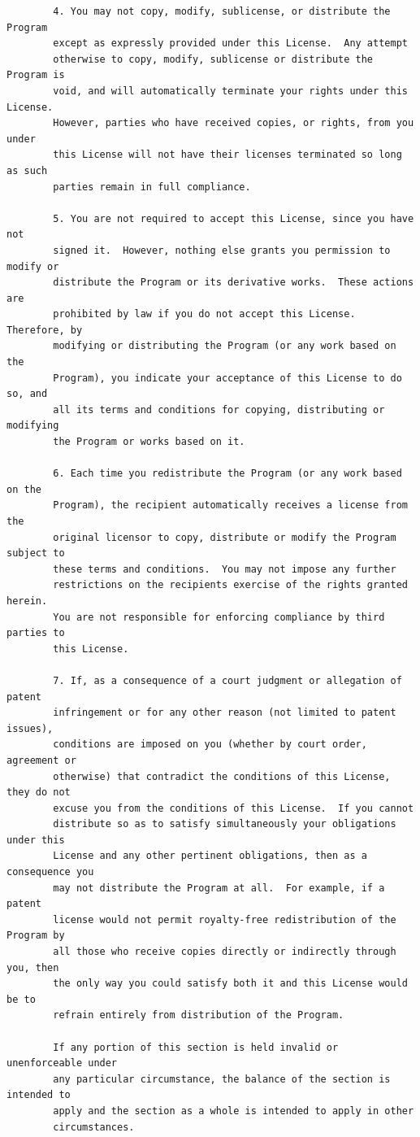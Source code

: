 \documentclass[a4paper,twoside,12pt]{book}
\begin{document}
{\begin{verbatim}
		4. You may not copy, modify, sublicense, or distribute the Program
		except as expressly provided under this License.  Any attempt
		otherwise to copy, modify, sublicense or distribute the Program is
		void, and will automatically terminate your rights under this License.
		However, parties who have received copies, or rights, from you under
		this License will not have their licenses terminated so long as such
		parties remain in full compliance.

		5. You are not required to accept this License, since you have not
		signed it.  However, nothing else grants you permission to modify or
		distribute the Program or its derivative works.  These actions are
		prohibited by law if you do not accept this License.  Therefore, by
		modifying or distributing the Program (or any work based on the
		Program), you indicate your acceptance of this License to do so, and
		all its terms and conditions for copying, distributing or modifying
		the Program or works based on it.

		6. Each time you redistribute the Program (or any work based on the
		Program), the recipient automatically receives a license from the
		original licensor to copy, distribute or modify the Program subject to
		these terms and conditions.  You may not impose any further
		restrictions on the recipients exercise of the rights granted herein.
		You are not responsible for enforcing compliance by third parties to
		this License.

		7. If, as a consequence of a court judgment or allegation of patent
		infringement or for any other reason (not limited to patent issues),
		conditions are imposed on you (whether by court order, agreement or
		otherwise) that contradict the conditions of this License, they do not
		excuse you from the conditions of this License.  If you cannot
		distribute so as to satisfy simultaneously your obligations under this
		License and any other pertinent obligations, then as a consequence you
		may not distribute the Program at all.  For example, if a patent
		license would not permit royalty-free redistribution of the Program by
		all those who receive copies directly or indirectly through you, then
		the only way you could satisfy both it and this License would be to
		refrain entirely from distribution of the Program.

		If any portion of this section is held invalid or unenforceable under
		any particular circumstance, the balance of the section is intended to
		apply and the section as a whole is intended to apply in other
		circumstances.


\end{verbatim}}
\end{document}
